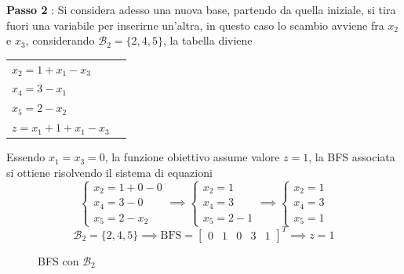 \documentclass[10pt, letterpaper]{report}
\begin{document}
\textbf{Passo 2} : Si considera adesso una nuova base, partendo da quella iniziale, si tira fuori una variabile per inserirne un'altra, in questo caso lo scambio avviene fra $x_2$ e $x_3$, considerando $\mathcal B_2 = \{2,4,5\}$, la tabella diviene 
\begin{center}
    \begin{tabular}{|l|l|}\hline 
        $x_2=1+x_1-x_3$\\ 
        $x_4=3-x_1$\\ 
        $x_5=2-x_2$ \\
        \hline 
        $z=x_1+1+x_1-x_3$ \\\hline 
    \end{tabular}
\end{center}
Essendo $x_1=x_3=0$, la funzione obiettivo assume valore $z=1$, la BFS associata si ottiene risolvendo il sistema di equazioni
$$\begin{cases}
    x_2=1+0-0\\ 
    x_4=3-0\\ 
    x_5=2-x_2
\end{cases}\implies\begin{cases}
    x_2=1\\ 
    x_4=3\\ 
    x_5=2-1
\end{cases}\implies\begin{cases}
    x_2=1\\ x_4=3\\ x_5=1
\end{cases}$$
$$ \mathcal{B}_2 = \{2,4,5\}\implies \text{BFS}=\begin{bmatrix}
    0 & 1 & 0 & 3 & 1 
\end{bmatrix}^T \implies z = 1$$
\begin{figure}[h]
    \caption{BFS con $\mathcal B_2$}
\end{figure}
\end{document}
